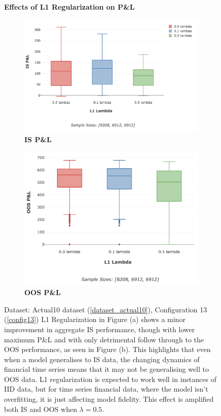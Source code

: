 \documentclass[a4paper,11pt,oneside]{article}
\theoremstyle{plain}
\theoremstyle{definition}
\begin{document}
	\begin{figure}[H]
		\centering
		\textbf{Effects of L1 Regularization on P\&L}
		\begin{subfigure}{.5\textwidth}
			\includegraphics[scale=0.3]{images/results/complexity/is_actual_pl_reg.png}
			\caption{\textbf{IS P\&L} }
			\label{figure-is_actual_pl_reg}
		\end{subfigure}%
		\begin{subfigure}{.5\textwidth}
			\includegraphics[scale=0.3]{images/results/complexity/oos_actual_pl_reg.png}
			\caption{\textbf{OOS P\&L} }
			\label{figure-oos_actual_pl_reg}
		\end{subfigure}
		\caption[Effects of L1 Regularization on P\&L]
		{Dataset: Actual10 dataset (\ref{dataset_actual10}),  Configuration 13 (\ref{config13})
			\newline L1 Regularization in Figure (a) shows a minor improvement in aggregate IS performance, though with lower maximum P\&L and with only detrimental follow through to the OOS performance, as seen in Figure (b). This highlights that even when a model generalises to IS data, the changing dynamics of financial time series means that it may not be generalising well to OOS data. L1 regularization is expected to work well in instances of IID data, but for time series financial data, where the model isn't overfitting, it is just affecting model fidelity. This effect is amplified both IS and OOS when $\lambda = 0.5$.}
		\label{figure-results-reg}
	\end{figure}
	
\end{document}
